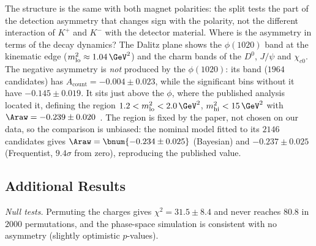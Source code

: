 The structure is the same with both magnet polarities: %
the split tests the part of the detection asymmetry that changes sign with the polarity, not the different interaction of $K^+$ and $K^-$ with the detector material.
Where is the asymmetry in terms of the decay dynamics? The Dalitz plane shows the $\phi(1020)$ band at the kinematic edge ($m^2_{\mathrm{lo}}\approx1.04\,\GeV^2$) and the charm bands of the $D^0$, $J/\psi$ and $\chi_{c0}$. The negative asymmetry is \emph{not} produced by the $\phi(1020)$: its band ($1964$ candidates) has $A_{\mathrm{count}}=-0.004\pm0.023$, while the significant bins without it have $-0.145\pm0.019$. It sits just above the $\phi$, where the published analysis located it, defining the region $1.2<m^2_{\mathrm{lo}}<2.0\,\GeV^2$, $m^2_{\mathrm{hi}}<15\,\GeV^2$ with $\Araw=-0.239\pm0.020$~\cite{lhcb_cpv_2013}. The region is fixed by the paper, not chosen on our data, so the comparison is unbiased: the nominal model fitted to its $2146$ candidates gives $\Araw=\bnum{-0.234\pm0.025}$ (Bayesian) and $-0.237\pm0.025$ (Frequentist, $9.4\sigma$ from zero), reproducing the published value.

\subsection{Additional Results}
\emph{Null tests.} Permuting the charges gives $\chi^2=31.5\pm8.4$ and never reaches $80.8$ in $2000$ permutations, and the phase-space simulation is consistent with no asymmetry (slightly optimistic $p$-values).
